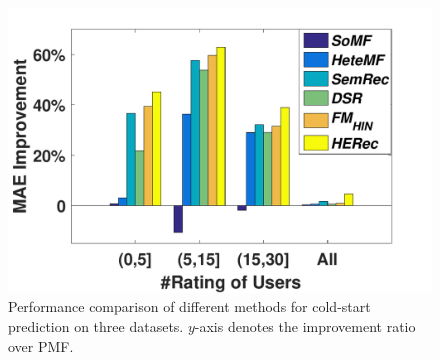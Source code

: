 \begin{figure}
{\begin{minipage}[b]{0.3\textwidth}
\includegraphics[width=1\textwidth]{image/cold_start_mae_db.pdf}
\end{minipage}
}
\caption{\label{fig_cs}Performance comparison of different methods for cold-start prediction on three datasets. $y$-axis denotes the improvement ratio over PMF.}
\end{figure}

